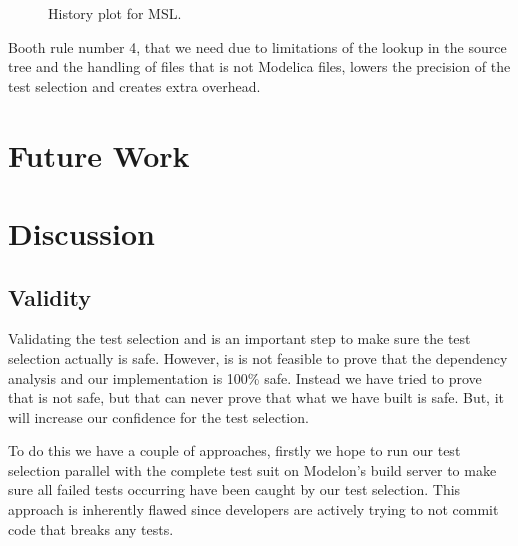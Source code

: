 \documentclass{cslthse-msc}
\begin{document}
\begin{figure}
    \centering
    \caption{History plot for MSL.}
    \label{fig:mslhistory}
\end{figure}
 
 Booth rule number 4, that we need due to limitations of the lookup in the source tree and the handling of files that is not Modelica files, lowers the precision of the test selection and creates extra overhead.

\chapter[Future Work]{Future Work}
	
\chapter[Discussion]{Discussion}

\section{Validity}
Validating the test selection and is an important step to make sure the test selection actually is safe. 
However, is is not feasible to prove that the dependency analysis and our implementation is 100\% safe. Instead we have tried to prove that is not safe, but that can never prove that what we have built is safe. But, it will increase our confidence for the test selection. 

To do this we have a couple of approaches, firstly we hope to run our test selection parallel with the complete test suit on Modelon's build server to make sure all failed tests occurring have been caught by our test selection. This approach is inherently flawed since developers are actively trying to not commit code that breaks any tests. %
\end{document}
